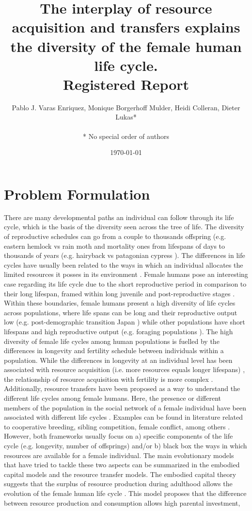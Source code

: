 \documentclass{article}
\title{The interplay of resource acquisition and transfers explains the diversity of the female human life cycle.
\\
Registered Report}
\author{Pablo J. Varas Enriquez, Monique Borgerhoff Mulder, Heidi Colleran, Dieter Lukas*\\\\
* No special order of authors}
\date{\today}
\begin{document}
\maketitle

\tableofcontents

\section{Problem Formulation}

There are many developmental paths an individual can follow through its life cycle, which is the basis of the diversity seen across the tree of life. The diversity of reproductive schedules can go from a couple to thousands offspring (e.g. eastern hemlock vs rain moth \citep{tindale1932revision,van2017lifetime} and mortality ones from lifespans of days to thousands of years (e.g. hairyback vs patagonian cypress \citep{balsamo1988life,lara19933620}). The differences in life cycles have usually been related to the ways in which an individual allocates the limited resources it posses in its environment \citep{stearns2000life}. Female humans pose an interesting case regarding its life cycle due to the short reproductive period in comparison to their long lifespan, framed within long juvenile and post-reproductive stages \citep{kaplan2000theory}. Within these boundaries, female humans present a high diversity of life cycles across populations, where life spans can be long and their reproductive output low (e.g. post-demographic transition Japan \citep{de2017maximum}) while other populations have short lifespans and high reproductive output (e.g. foraging populations \citep{migliano2007life}). The high diversity of female life cycles among human populations is fuelled by the differences in longevity and fertility schedule between individuals within a population. While the differences in longevity at an individual level has been associated with resource acquisition (i.e. more resources equals longer lifespans) \citep{kaplan2003embodied}, the relationship of resource acquisition with fertility is more complex \citep{mulder1998demographic,sear2016understanding}. Additionally, resource transfers have been proposed as a way to understand the different life cycles among female humans. Here, the presence or different members of the population in the social network of a female individual have been associated with different life cycles \citep{sear2011much}. Examples can be found in literature related to cooperative breeding, sibling competition, female conflict, among others \citep{ivey2000cooperative,nitsch2013elder,mace2012female}. However, both frameworks usually focus on a) specific components of the life cycle (e.g. longevity, number of offsprings) and/or b) black box the ways in which resources are available for a female individual. The main evolutionary models that have tried to tackle these two aspects can be summarized in the embodied capital models and the resource transfer models. The embodied capital theory suggests that the surplus of resource production during adulthood allows the evolution of the female human life cycle \citep{kaplan2000theory}. This model proposes that the difference between resource production and consumption allows high parental investment, 
\end{document}
